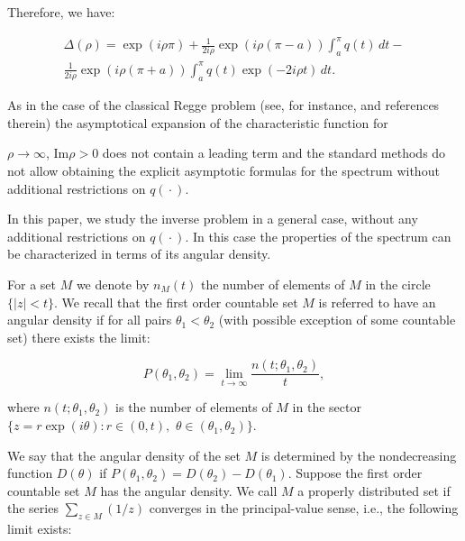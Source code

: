 Therefore, we have:

\begin{multline}

\Delta(\rho)=\exp(i\rho\pi)

+\frac{1}{2i\rho}\exp(i\rho(\pi-a))\int_a^\pi q(t)\,dt -\\

\frac{1}{2i\rho}\exp(i\rho(\pi+a))\int_a^\pi q(t)\exp(-2i\rho t)\,dt.

\end{multline}



As in the case of the classical Regge problem (see, for instance, \cite{ign:12} and references therein) the asymptotical expansion of the characteristic function for

 $\rho\to\infty$, $\mbox{Im}\rho>0$ does not contain a leading term and the standard methods do not allow obtaining the explicit asymptotic formulas for the spectrum without additional restrictions on $q({}\cdot{})$.





In this paper, we study the inverse problem in a general case, without any additional restrictions on $q({}\cdot{})$. In this case the properties of the spectrum can be characterized in terms of its angular density.

For a set $M$ we denote by $n_M(t)$ the number of elements of $M$ in the circle $\{|z|<t\}$. We recall that the first order countable set $M$ is referred to have an angular density if for all pairs $\theta_1<\theta_2$ (with possible exception of some countable set) there exists the limit:

$$

P(\theta_1,\theta_2)=\lim\limits_{t\to\infty}\frac{n(t;\theta_1,\theta_2)}{t},

$$

where $n(t;\theta_1,\theta_2)$ is the number of elements of $M$ in the sector $\bigl\{z=r\exp(i\theta): r\in(0,t),$ $ \theta\in(\theta_1,\theta_2)\bigr\}$. 

We say that the angular density of the set $M$ is determined by the nondecreasing function $D(\theta)$ if $P(\theta_1,\theta_2)=D(\theta_2)-D(\theta_1)$. Suppose the first order countable set $M$ has the angular density. We call $M$ a properly distributed set if the series  $\sum_{z\in M}(1/z)$ converges in the principal-value sense, i.e., the following limit exists:

$$

